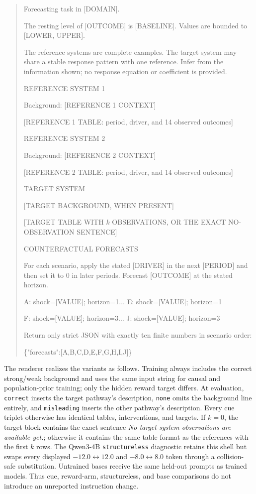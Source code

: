 \begin{quote}
\begingroup\ttfamily\scriptsize\raggedright
Forecasting task in [DOMAIN].

\smallskip
The resting level of [OUTCOME] is [BASELINE]. Values are bounded to
[LOWER, UPPER].

\smallskip
The reference systems are complete examples. The target system may share a
stable response pattern with one reference. Infer from the information shown;
no response equation or coefficient is provided.

\smallskip
REFERENCE SYSTEM 1

Background: [REFERENCE 1 CONTEXT]

[REFERENCE 1 TABLE: period, driver, and 14 observed outcomes]

\smallskip
REFERENCE SYSTEM 2

Background: [REFERENCE 2 CONTEXT]

[REFERENCE 2 TABLE: period, driver, and 14 observed outcomes]

\smallskip
TARGET SYSTEM

[TARGET BACKGROUND, WHEN PRESENT]

[TARGET TABLE WITH $k$ OBSERVATIONS, OR THE EXACT NO-OBSERVATION SENTENCE]

\smallskip
COUNTERFACTUAL FORECASTS

For each scenario, apply the stated [DRIVER] in the next [PERIOD] and then set it
to 0 in later periods. Forecast [OUTCOME] at the stated horizon.

\smallskip
A: shock=[VALUE]; horizon=1\quad $\ldots$\quad
E: shock=[VALUE]; horizon=1

F: shock=[VALUE]; horizon=3\quad $\ldots$\quad
J: shock=[VALUE]; horizon=3

\smallskip
Return only strict JSON with exactly ten finite numbers in scenario order:

\{"forecasts":[A,B,C,D,E,F,G,H,I,J]\}
\endgroup
\end{quote}

The renderer realizes the variants as follows. Training always includes the
correct strong/weak background and uses the same input string for causal and
population-prior training; only the hidden reward target differs. At evaluation,
\texttt{correct} inserts the target pathway's description, \texttt{none} omits
the background line entirely, and \texttt{misleading} inserts the other
pathway's description. Every cue triplet otherwise has identical tables,
interventions, and targets. If $k=0$, the target block contains the exact
sentence \emph{No target-system observations are available yet.}; otherwise it
contains the same table format as the references with the first $k$ rows. The
Qwen3-4B \texttt{structureless} diagnostic retains this shell but swaps every
displayed $-12.0\leftrightarrow12.0$ and $-8.0\leftrightarrow8.0$ token through
a collision-safe substitution. Untrained bases receive the same held-out
prompts as trained models. Thus cue, reward-arm, structureless, and base
comparisons do not introduce an unreported instruction change.

